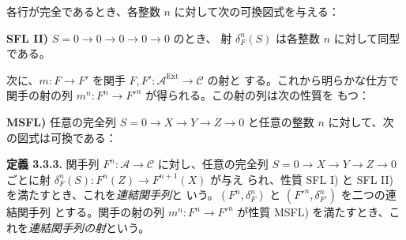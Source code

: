 \clearpage
{}%
\begingroup\small\setlength{\parskip}{0pt}\setlength{\emergencystretch}{1.5em}
\setlength{\abovedisplayskip}{4pt plus 2pt minus 2pt}%
\setlength{\belowdisplayskip}{4pt plus 2pt minus 2pt}%

各行が完全であるとき、各整数 $n$ に対して次の可換図式を与える：
\begin{center}
\end{center}

\noindent\textbf{SFL II)}
$S=0\longrightarrow0\longrightarrow0\longrightarrow0\longrightarrow0$ のとき、
射 $\delta_F^n(S)$ は各整数 $n$ に対して同型である。

次に、$m\colon F\longrightarrow F'$ を関手
$F,F'\colon\mathcal A^{\operatorname{Ext}}\longrightarrow\mathcal C$ の射と
する。これから明らかな仕方で関手の射の列
$m^n\colon F^n\longrightarrow {F'}^n$ が得られる。この射の列は次の性質を
もつ：

\noindent\textbf{MSFL)} 任意の完全列
$S=0\longrightarrow X\longrightarrow Y\longrightarrow Z\longrightarrow0$
と任意の整数 $n$ に対して、次の図式は可換である：

\begin{center}
\end{center}

\medskip\noindent\textbf{定義 3.3.3.}\quad
関手列 $F^n\colon\mathcal A\longrightarrow\mathcal C$ に対し、任意の完全列
$S=0\longrightarrow X\longrightarrow Y\longrightarrow Z\longrightarrow0$
ごとに射 $\delta_F^n(S)\colon F^n(Z)\longrightarrow F^{n+1}(X)$ が与え
られ、性質 SFL I) と SFL II) を満たすとき、これを\emph{連結関手列}と
いう。$(F^n,\delta_F^n)$ と $({F'}^n,\delta_{F'}^n)$ を二つの連結関手列
とする。関手の射の列 $m^n\colon F^n\longrightarrow {F'}^n$ が性質
MSFL) を満たすとき、これを\emph{連結関手列の射}という。

